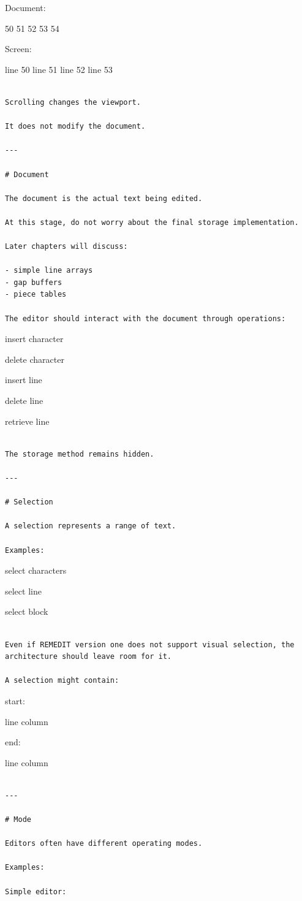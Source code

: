 \documentclass[
  oneside,
  openany]{book}
\begin{document}
Document:

50 51 52 53 54

Screen:

line 50 line 51 line 52 line 53

\begin{verbatim}

Scrolling changes the viewport.

It does not modify the document.

---

# Document

The document is the actual text being edited.

At this stage, do not worry about the final storage implementation.

Later chapters will discuss:

- simple line arrays
- gap buffers
- piece tables

The editor should interact with the document through operations:
\end{verbatim}

insert character

delete character

insert line

delete line

retrieve line

\begin{verbatim}

The storage method remains hidden.

---

# Selection

A selection represents a range of text.

Examples:
\end{verbatim}

select characters

select line

select block

\begin{verbatim}

Even if REMEDIT version one does not support visual selection, the architecture should leave room for it.

A selection might contain:
\end{verbatim}

start:

line column

end:

line column

\begin{verbatim}

---

# Mode

Editors often have different operating modes.

Examples:

Simple editor:
\end{verbatim}
\end{document}
